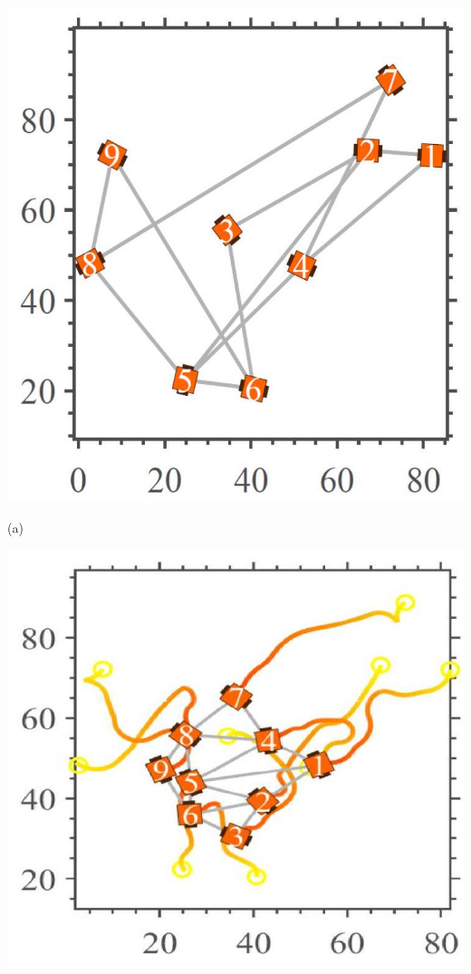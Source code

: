 \documentclass[10pt]{article}
\begin{document}
\begin{center}
\includegraphics[max width=\textwidth]{2023_10_07_53b70c7408bc8e139415g-51(1)}
\end{center}

(a)

\begin{center}
\includegraphics[max width=\textwidth]{2023_10_07_53b70c7408bc8e139415g-51}
\end{center}
\end{document}
